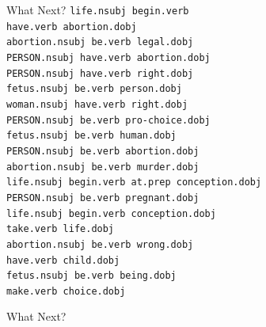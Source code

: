 \documentclass{beamer}
\begin{document}
  \begin{frame}{What Next?}
    \texttt{life.nsubj begin.verb\\
      have.verb abortion.dobj\\
      abortion.nsubj be.verb legal.dobj\\
      PERSON.nsubj have.verb abortion.dobj\\
      PERSON.nsubj have.verb right.dobj\\
      fetus.nsubj be.verb person.dobj\\
      woman.nsubj have.verb right.dobj\\
      PERSON.nsubj be.verb pro-choice.dobj\\
      fetus.nsubj be.verb human.dobj\\
      PERSON.nsubj be.verb abortion.dobj\\
      abortion.nsubj be.verb murder.dobj\\
      life.nsubj begin.verb at.prep conception.dobj\\
      PERSON.nsubj be.verb pregnant.dobj\\
      life.nsubj begin.verb conception.dobj\\
      take.verb life.dobj\\
      abortion.nsubj be.verb wrong.dobj\\
      have.verb child.dobj\\
      fetus.nsubj be.verb being.dobj\\
      make.verb choice.dobj}
  \end{frame}

  \begin{frame}{What Next?}
  \end{frame}
\end{document}
